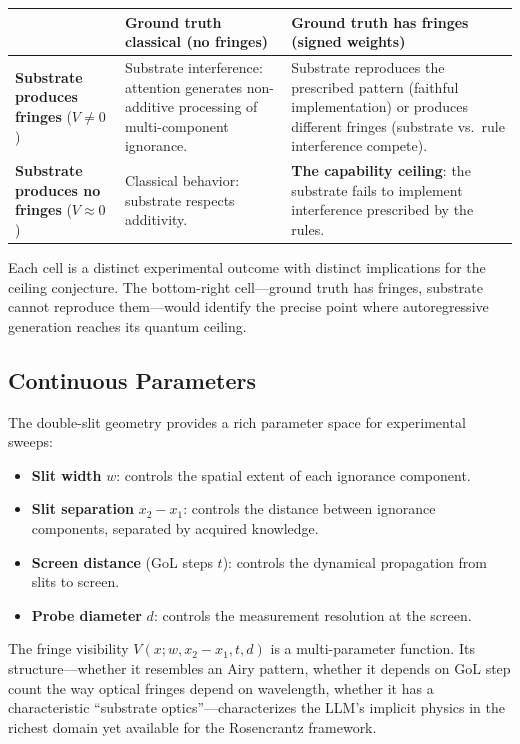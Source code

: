 \documentclass[12pt,a4paper]{article}
\theoremstyle{definition}
\theoremstyle{remark}
\begin{document}
\begin{center}
\begin{tabular}{@{}p{3.5cm}p{5cm}p{5cm}@{}}
\toprule
& \textbf{Ground truth classical} (no fringes) & \textbf{Ground truth has fringes} (signed weights) \\
\midrule
\textbf{Substrate produces fringes} ($V \neq 0$)
  & Substrate interference: attention generates non-additive processing of multi-component ignorance.
  & Substrate reproduces the prescribed pattern (faithful implementation) or produces different fringes (substrate vs.\ rule interference compete). \\[1em]
\textbf{Substrate produces no fringes} ($V \approx 0$)
  & Classical behavior: substrate respects additivity.
  & \textbf{The capability ceiling}: the substrate fails to implement interference prescribed by the rules. \\
\bottomrule
\end{tabular}
\end{center}

Each cell is a distinct experimental outcome with distinct implications for the ceiling conjecture.  The bottom-right cell---ground truth has fringes, substrate cannot reproduce them---would identify the precise point where autoregressive generation reaches its quantum ceiling.

\subsection{Continuous Parameters}

The double-slit geometry provides a rich parameter space for experimental sweeps:
\begin{itemize}[nosep]
  \item \textbf{Slit width} $w$: controls the spatial extent of each ignorance component.
  \item \textbf{Slit separation} $x_2 - x_1$: controls the distance between ignorance components, separated by acquired knowledge.
  \item \textbf{Screen distance} (GoL steps $t$): controls the dynamical propagation from slits to screen.
  \item \textbf{Probe diameter} $d$: controls the measurement resolution at the screen.
\end{itemize}

The fringe visibility $V(x; w, x_2 - x_1, t, d)$ is a multi-parameter function.  Its structure---whether it resembles an Airy pattern, whether it depends on GoL step count the way optical fringes depend on wavelength, whether it has a characteristic ``substrate optics''---characterizes the LLM's implicit physics in the richest domain yet available for the Rosencrantz framework.
\end{document}
